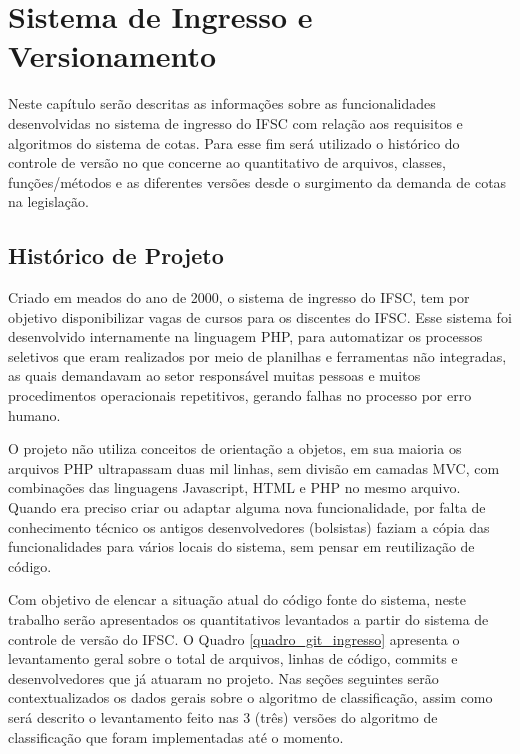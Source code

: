 \chapter{Sistema de Ingresso e Versionamento}
\label{chap:historicoversoes}

Neste capítulo serão descritas as informações sobre as funcionalidades desenvolvidas no sistema de ingresso do \gls{IFSC} com relação aos requisitos e algoritmos do sistema de cotas. Para esse fim será utilizado o histórico do controle de versão no que concerne ao quantitativo de arquivos, classes, funções/métodos e as diferentes versões desde o surgimento da demanda de cotas na legislação.

\section{Histórico de Projeto}
\label{historicopj}
Criado em meados do ano de 2000, o sistema de ingresso do \gls{IFSC}, tem por objetivo disponibilizar vagas de cursos para os discentes do \gls{IFSC}. Esse sistema foi desenvolvido internamente na linguagem PHP, para automatizar os processos seletivos que eram realizados por meio de planilhas e ferramentas não integradas, as quais demandavam ao setor responsável muitas pessoas e muitos procedimentos operacionais repetitivos, gerando falhas no processo por erro humano.

O projeto não utiliza conceitos de orientação a objetos, em sua maioria os arquivos PHP ultrapassam duas mil linhas, sem divisão em camadas \gls{MVC}, com combinações das linguagens Javascript, HTML e PHP no mesmo arquivo. Quando era preciso criar ou adaptar alguma nova funcionalidade, por falta de conhecimento técnico os antigos desenvolvedores (bolsistas) faziam a cópia das funcionalidades para vários locais do sistema, sem pensar em reutilização de código.

Com objetivo de elencar a situação atual do código fonte do sistema, neste trabalho serão apresentados os quantitativos levantados a partir do sistema de controle de versão do \gls{IFSC}. O Quadro \ref{quadro_git_ingresso} apresenta o levantamento geral sobre o total de arquivos, linhas de código, commits e desenvolvedores que já atuaram no projeto. Nas seções seguintes serão contextualizados os dados gerais sobre o algoritmo de classificação, assim como será descrito o levantamento feito nas 3 (três) versões do algoritmo de classificação que foram implementadas até o momento.




